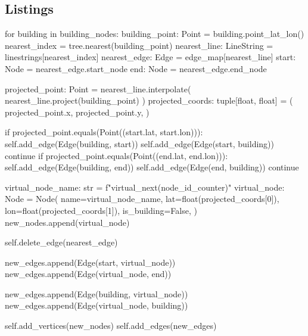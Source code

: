 \subsection{Listings}
\begin{python}[caption={The algorithm to connect the buildings to the road network}, label={lst:python-edges}]
for building in building_nodes:
    building_point: Point = building.point_lat_lon()
    nearest_index = tree.nearest(building_point)
    nearest_line: LineString = linestrings[nearest_index]
    nearest_edge: Edge = edge_map[nearest_line]
    start: Node = nearest_edge.start_node
    end: Node = nearest_edge.end_node

    projected_point: Point = nearest_line.interpolate(
        nearest_line.project(building_point)
    )
    projected_coords: tuple[float, float] = (
        projected_point.x,
        projected_point.y,
    )

    if projected_point.equals(Point((start.lat, start.lon))):
        self.add_edge(Edge(building, start))
        self.add_edge(Edge(start, building))
        continue
    if projected_point.equals(Point((end.lat, end.lon))):
        self.add_edge(Edge(building, end))
        self.add_edge(Edge(end, building))
        continue

    virtual_node_name: str = 
        f"virtual_{next(node_id_counter)}"
    virtual_node: Node = Node(
        name=virtual_node_name,
        lat=float(projected_coords[0]),
        lon=float(projected_coords[1]),
        is_building=False,
    )
    new_nodes.append(virtual_node)

    self.delete_edge(nearest_edge)

    new_edges.append(Edge(start, virtual_node))
    new_edges.append(Edge(virtual_node, end))

    new_edges.append(Edge(building, virtual_node))
    new_edges.append(Edge(virtual_node, building))

self.add_vertices(new_nodes)
self.add_edges(new_edges)
\end{python}
